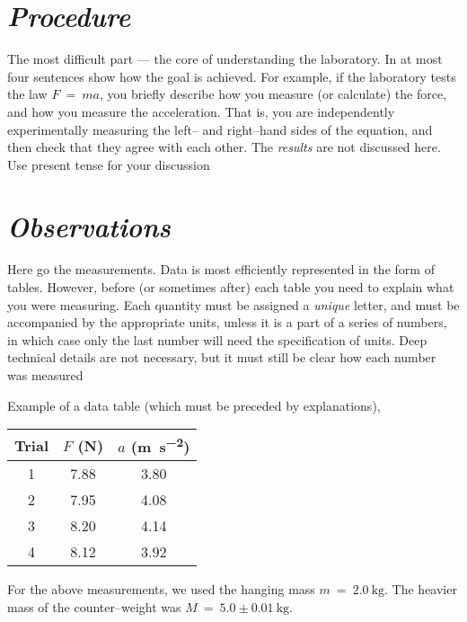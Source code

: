 \documentclass[epsfig,12pt]{article}
\begin{document}
\section*{\textit{Procedure}}

	The most difficult part --- the core of understanding the laboratory.
	In at most four sentences show how the goal is achieved.
	For example, if the laboratory tests the law $ F ~=~ m a $,
	you briefly describe how you measure (or calculate) the force,
	and how you measure the acceleration.
	That is, you are independently experimentally measuring the left-- and right--hand sides 
	of the equation, and then check that they agree with each other.
	The \emph{results} are not discussed here.
	Use present tense for your discussion
	

\section*{\textit{Observations}}

	Here go the measurements.
	Data is most efficiently represented in the form of tables.
	However, before (or sometimes after) each table you need to explain what you were measuring.
	Each quantity must be assigned a \emph{unique} letter, and must be accompanied by
	the appropriate units, unless it is a part of a series of numbers, in which case
	only the last number will need the specification of units.
	Deep technical details are not necessary,
	but it must still be clear how each number was measured
	
\bigskip\noindent
	Example of a data table (which must be preceded by explanations),
\begin{center}
\begin{tabular}{ccc}
%
\toprule
%
	Trial	&	$ F $ (\si{\newton})	&	$ a $ (\si{\metre\per\square\second})	\\[2mm]
%
\midrule
%
	1	&	7.88	&	3.80	\\[2mm]
	2	&	7.95	&	4.08	\\[2mm]
	3	&	8.20	&	4.14	\\[2mm]
	4	&	8.12	&	3.92	\\[2mm]
%
\bottomrule
\end{tabular}
\end{center}
	For the above measurements, we used the hanging mass $ m ~=~ \SI{2.0}{\kg} $.
	The heavier mass of the counter--weight was $ M ~=~ 5.0 \pm \SI{0.01}{\kg} $.
\end{document}
